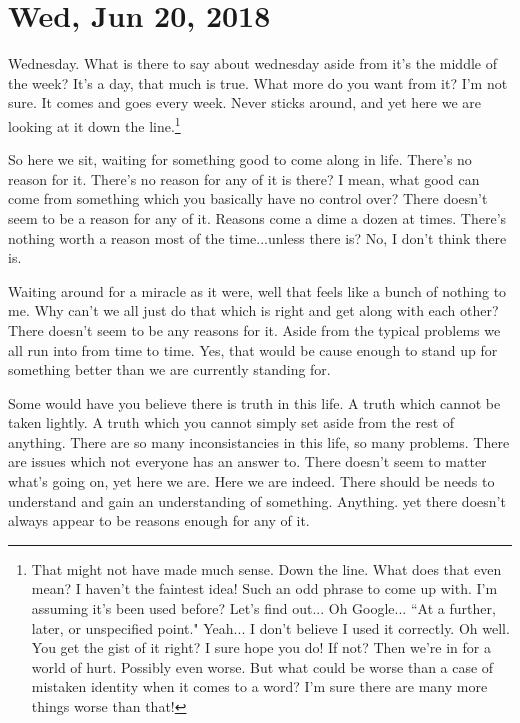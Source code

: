 \section{Wed, Jun 20, 2018}

Wednesday. What is there to say about wednesday aside from it's the middle of
the week? It's a day, that much is true. What more do you want from it? I'm not
sure. It comes and goes every week. Never sticks around, and yet here we are
looking at it down the line.\footnote{
That might not have made much sense. Down the line. What does that even mean? I
haven't the faintest idea! Such an odd phrase to come up with. I'm assuming it's
been used before? Let's find out... Oh Google... ``At a further, later, or 
unspecified point." Yeah... I don't believe I used it correctly. Oh well. You
get the gist of it right? I sure hope you do! If not? Then we're in for a world
of hurt. Possibly even worse. But what could be worse than a case of mistaken
identity when it comes to a word? I'm sure there are many more things worse than
that!
}

So here we sit, waiting for something good to come along in life. There's no
reason for it. There's no reason for any of it is there? I mean, what good can
come from something which you basically have no control over? There doesn't seem
to be a reason for any of it. Reasons come a dime a dozen at times. There's
nothing worth a reason most of the time...unless there is? No, I don't think
there is.

Waiting around for a miracle as it were, well that feels like a bunch of nothing
to me. Why can't we all just do that which is right and get along with each
other? There doesn't seem to be any reasons for it. Aside from the typical
problems we all run into from time to time. Yes, that would be cause enough to
stand up for something better than we are currently standing for.

Some would have you believe there is truth in this life. A truth which cannot be
taken lightly. A truth which you cannot simply set aside from the rest of
anything. There are so many inconsistancies in this life, so many problems.
There are issues which not everyone has an answer to. There doesn't seem to
matter what's going on, yet here we are. Here we are indeed. There should be
needs to understand and gain an understanding of something. Anything. yet there
doesn't always appear to be reasons enough for any of it.

